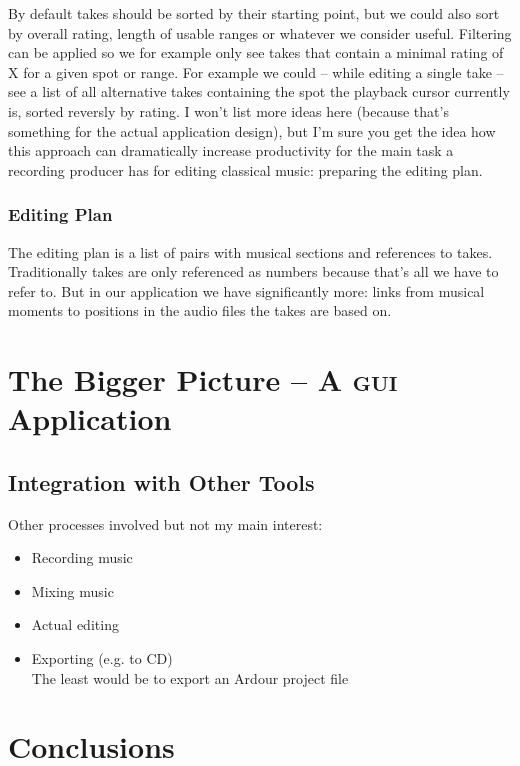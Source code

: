 \documentclass[11pt,a4paper]{article}
\begin{document}
By default takes should be sorted by their starting point, but we could also sort by overall rating, length of usable ranges or whatever we consider useful.
Filtering can be applied so we for example only see takes that contain a minimal rating of X for a given spot or range.
For example we could -- while editing a single take -- see a list of all alternative takes containing the spot the playback cursor currently is, sorted reversly by rating.
I won't list more ideas here (because that's something for the actual application design), but I'm sure you get the idea how this approach can dramatically increase productivity for the main task a recording producer has for editing classical music: preparing the editing plan.

\subsubsection{Editing Plan}
The editing plan is a list of pairs with musical sections and references to takes.
Traditionally takes are only referenced as numbers because that's all we have to refer to.
But in our application we have significantly more: links from musical moments to positions in the audio files the takes are based on.

\section{The Bigger Picture -- A \textsc{gui} Application}

\subsection{Integration with Other Tools}

Other processes involved but not my main interest:

\begin{itemize}
\item Recording music
\item Mixing music
\item Actual editing
\item Exporting (e.g. to CD)\\
	The least would be to export an Ardour project file
\end{itemize}

\section{Conclusions}
\end{document}
